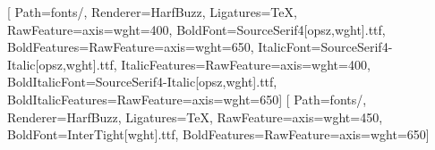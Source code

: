 \usepackage{fontspec}
\setmainfont{SourceSerif4[opsz,wght].ttf}[
  Path=fonts/, Renderer=HarfBuzz, Ligatures=TeX, RawFeature={axis={wght=400}},
  BoldFont={SourceSerif4[opsz,wght].ttf}, BoldFeatures={RawFeature={axis={wght=650}}},
  ItalicFont={SourceSerif4-Italic[opsz,wght].ttf}, ItalicFeatures={RawFeature={axis={wght=400}}},
  BoldItalicFont={SourceSerif4-Italic[opsz,wght].ttf},
  BoldItalicFeatures={RawFeature={axis={wght=650}}}]
\setsansfont{InterTight[wght].ttf}[
  Path=fonts/, Renderer=HarfBuzz, Ligatures=TeX, RawFeature={axis={wght=450}},
  BoldFont={InterTight[wght].ttf}, BoldFeatures={RawFeature={axis={wght=650}}}]
\usepackage{sectsty}
\allsectionsfont{\sffamily}
\usepackage{etoolbox}
\makeatletter
\patchcmd{\@maketitle}{\LARGE \@title}{\sffamily\LARGE\bfseries \@title}{}{}
\makeatother
